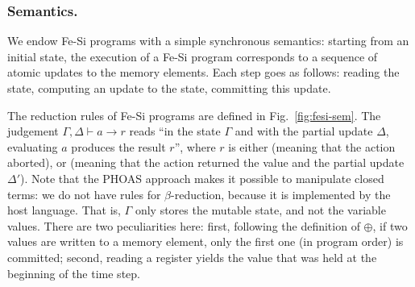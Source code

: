 \documentclass{llncs}
\begin{document}
\subsubsection{Semantics.}
We endow Fe-Si programs with a simple synchronous semantics:  starting
from an initial state, the execution of a Fe-Si program corresponds
to a sequence of atomic updates to the memory elements. 
%
Each step goes as follows: reading the state, computing an update to
the state, committing this update.
%
%
\begin{figure*}
  \centering
\caption{Dynamic semantics of Fe-Si programs}\label{fig:fesi-sem}
\end{figure*}

The reduction rules of Fe-Si programs are defined in
Fig.~\ref{fig:fesi-sem}. The judgement $\Gamma, \Delta \vdash a \to r$
reads ``in the state $\Gamma$ and with the partial update $\Delta$,
evaluating $a$ produces the result $r$'', where $r$ is either
 (meaning that the action aborted), or %
 (meaning that the action returned the value
 and the partial update $\Delta'$).
%
Note that the PHOAS approach makes it possible to manipulate closed
terms: we do not have rules for $\beta$-reduction, because it is
implemented by the host language.
%
That is, $\Gamma$ only stores the mutable state, and not the variable
values.
%
There are two peculiarities here: first, following the definition of
$\oplus$, if two values are written to a memory element, only the
first one (in program order) is committed; second, reading a register
yields the value that was held at the beginning of the time step. 
\end{document}
